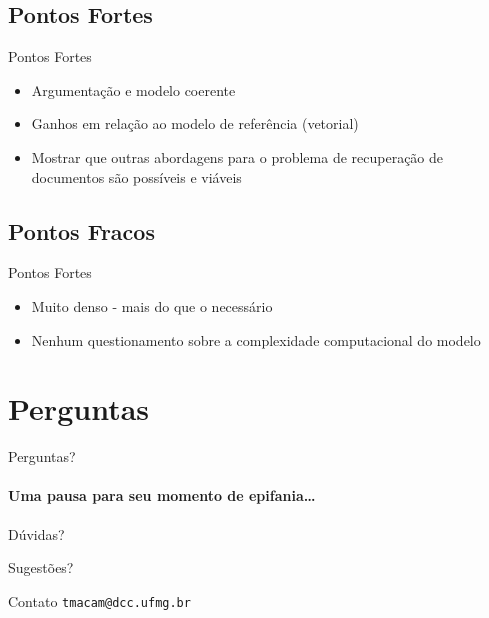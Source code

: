 \documentclass[compress]{beamer}
\begin{document}
\subsection{Pontos Fortes}

    \begin{frame}{Pontos Fortes}
            \begin{itemize}
                \item Argumentação e modelo coerente
                \item Ganhos em relação ao modelo de referência (vetorial)
                \item Mostrar que outras abordagens para o problema de recuperação de documentos
                são possíveis e viáveis
            \end{itemize}
    \end{frame}

\subsection{Pontos Fracos}

    \begin{frame}{Pontos Fortes}
            \begin{itemize}
                \item Muito denso - mais do que o necessário
                \item Nenhum questionamento sobre a complexidade computacional do modelo
            \end{itemize}
    \end{frame}



\section{Perguntas}
\begin{frame}{Perguntas?}
\framesubtitle{Uma pausa para seu momento de epifania\ldots}

    Dúvidas?
    \vspace{1cm}
    \pause

    Sugestões?
    \vspace{1cm}
    \pause

    \begin{block}{Contato}
    \texttt{tmacam@dcc.ufmg.br}
    \end{block}

\end{frame}
\end{document}
